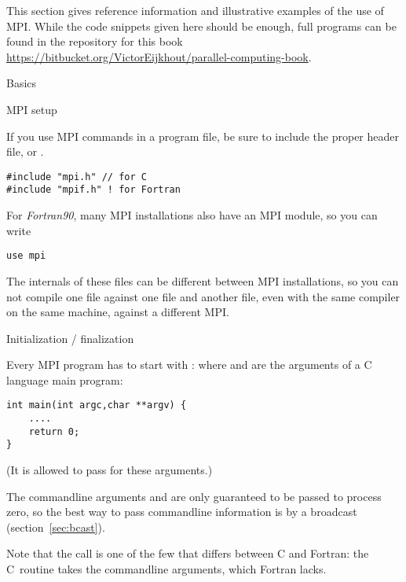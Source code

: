 
This section gives reference information and illustrative examples
of the use of MPI. While the code snippets given here should be enough,
full programs can be found in the repository for this book
\url{https://bitbucket.org/VictorEijkhout/parallel-computing-book}.

 {Basics}

 {MPI setup}

If you use MPI commands in a program file, be sure to include
the proper header file,  or .
\begin{verbatim}
#include "mpi.h" // for C
#include "mpif.h" ! for Fortran
\end{verbatim}
For \emph{Fortran90}, many MPI installations
also have an MPI module, so you can write
\begin{verbatim}
use mpi
\end{verbatim}
The internals of these files can be different between MPI
installations, so you can not compile one file against one 
file and another file, even with the same compiler on the same machine,
against a different MPI.

 {Initialization / finalization}

Every MPI program has to start with :
%
%
where  and  are the arguments
of a C language main program:
\begin{verbatim}
int main(int argc,char **argv) {
    ....
    return 0;
}
\end{verbatim}
(It is allowed to pass  for these arguments.)

The commandline arguments  and  are only guaranteed to
be passed to process zero, so the best way to pass commandline information
is by a broadcast (section~\ref{sec:bcast}).

Note that the  call is one of the few that differs between C and Fortran:
the C~routine takes the commandline arguments, which Fortran lacks.

